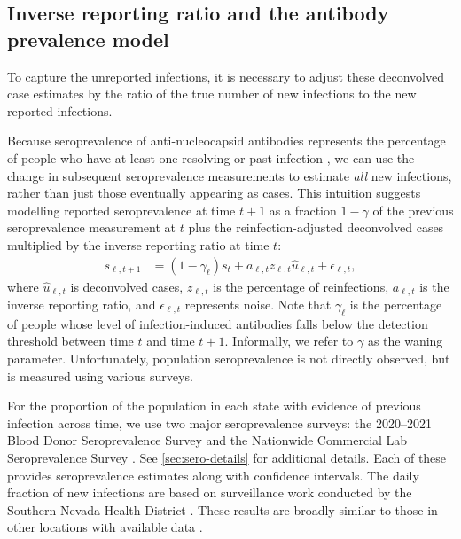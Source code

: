 \subsection{Inverse reporting ratio and the antibody prevalence model} 
\label{sec:report-ratio}

To capture the unreported infections, it is necessary to adjust these
deconvolved case estimates by the ratio of the true number of new infections to
the new reported infections. 

Because seroprevalence of anti-nucleocapsid antibodies represents the percentage
of people who have at least one resolving or past infection \citep{cdc2020data},
we can use the change in subsequent seroprevalence measurements to estimate
\emph{all} new infections, rather than just those eventually appearing as cases.
This intuition suggests modelling reported seroprevalence at time $t+1$ as a
fraction $1-\gamma$ of the previous seroprevalence measurement at $t$ plus the
reinfection-adjusted deconvolved cases multiplied by
the inverse reporting ratio at time $t$:
\begin{align}
s_{\ell,t+1} & = (1 -\gamma_{\ell}) s_t 
+ a_{\ell,t} z_{\ell,t} \widehat{u}_{\ell,t} + \epsilon_{\ell,t},
\end{align}
where $\widehat{u}_{\ell,t}$ is deconvolved cases,
$z_{\ell,t}$ is the percentage of reinfections, $a_{\ell,t}$ is the inverse
reporting ratio, and $\epsilon_{\ell,t}$ represents noise. Note that
$\gamma_{\ell}$ is the percentage of people whose level of infection-induced
antibodies falls below the detection threshold between time $t$ and time
$t+1$. Informally, we refer to $\gamma$ as the waning parameter. Unfortunately,
population seroprevalence is not directly observed, but is measured using
various surveys.

For the proportion of the population in each state with
evidence of previous infection across time, we use two major seroprevalence
surveys: the 2020--2021 Blood Donor Seroprevalence Survey and the Nationwide
Commercial Lab Seroprevalence Survey \citep{cdc2021blood, cdc2021comm}. See
\autoref{sec:sero-details} for additional details. Each of these provides
seroprevalence estimates along with confidence intervals.
The daily fraction of new infections are based on surveillance work conducted by
the Southern Nevada Health District \citep{ruff2022rapid}. These results
are broadly similar to those in other locations with available data  \citep{ruff2022rapid, nyreinfect2021, hireinfect2022, wareinfect2022}.

